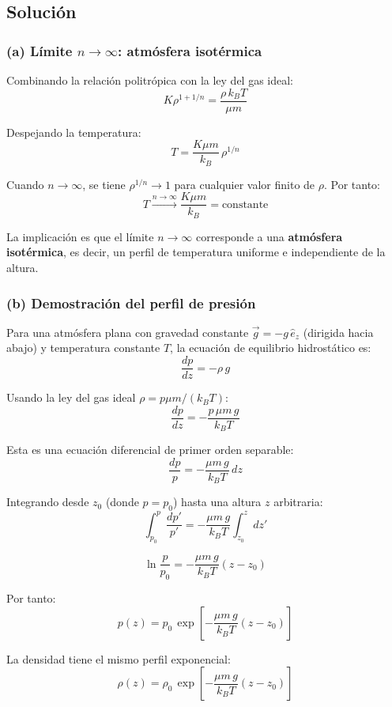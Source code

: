 \documentclass[a4paper]{article}
\begin{document}
\subsection{Solución}

\subsubsection{(a) Límite \texorpdfstring{$n \to \infty$}{n hacia infinito}: atmósfera isotérmica}

Combinando la relación politrópica con la ley del gas ideal:
$$
K\rho^{1+1/n} = \frac{\rho\, k_B T}{\mu m}
$$

Despejando la temperatura:
$$
T = \frac{K\mu m}{k_B}\,\rho^{1/n}
$$

Cuando $n \to \infty$, se tiene $\rho^{1/n} \to 1$ para cualquier valor finito de $\rho$. Por tanto:
$$
\boxed{T \xrightarrow{n \to \infty} \frac{K\mu m}{k_B} = \text{constante}}
$$

La implicación es que el límite $n \to \infty$ corresponde a una \textbf{atmósfera isotérmica}, es decir, un perfil de temperatura uniforme e independiente de la altura.

\subsubsection{(b) Demostración del perfil de presión}

Para una atmósfera plana con gravedad constante $\vec{g} = -g\,\hat{e}_z$ (dirigida hacia abajo) y temperatura constante $T$, la ecuación de equilibrio hidrostático es:
$$
\frac{dp}{dz} = -\rho\, g
$$

Usando la ley del gas ideal $\rho = p\mu m/(k_B T)$:
$$
\frac{dp}{dz} = -\frac{p\,\mu m\, g}{k_B T}
$$

Esta es una ecuación diferencial de primer orden separable:
$$
\frac{dp}{p} = -\frac{\mu m\, g}{k_B T}\, dz
$$

Integrando desde $z_0$ (donde $p = p_0$) hasta una altura $z$ arbitraria:
$$
\int_{p_0}^{p} \frac{dp'}{p'} = -\frac{\mu m\, g}{k_B T}\int_{z_0}^{z} dz'
$$

$$
\ln\frac{p}{p_0} = -\frac{\mu m\, g}{k_B T}(z - z_0)
$$

Por tanto:
$$
\boxed{p(z) = p_0\,\exp\!\left[-\frac{\mu m\, g}{k_B T}(z - z_0)\right]}
$$

La densidad tiene el mismo perfil exponencial:
$$
\rho(z) = \rho_0\,\exp\!\left[-\frac{\mu m\, g}{k_B T}(z - z_0)\right]
$$
\end{document}
